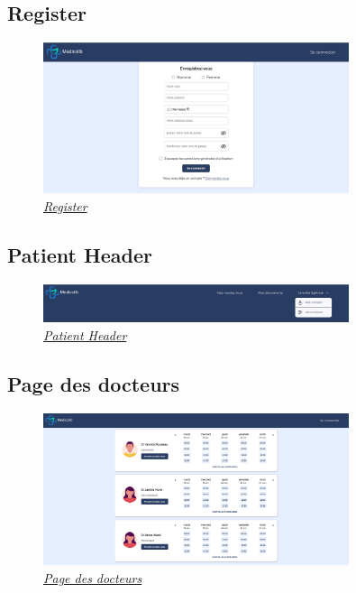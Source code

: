 \documentclass[a4paper]{report}
\begin{document}
\subsection{Register}
\begin{figure}[H]
    \vspace{-10pt}
    \centering
    \includegraphics[width=0.8\textwidth]{captures/register.png}
    \caption{\textit{\hyperref[register]{Register}}}
    \label{fig:DCU12}
\end{figure}

\subsection{Patient Header}
\begin{figure}[H]
    \vspace{-10pt}
    \centering
    \includegraphics[width=0.8\textwidth]{captures/patient-header.png}
    \caption{\textit{\hyperref[header]{Patient Header}}}
    \label{fig:DCU13}
\end{figure}

\subsection{Page des docteurs}
\begin{figure}[H]
    \vspace{-10pt}
    \centering
    \includegraphics[width=0.8\textwidth]{captures/docteurs.png}
    \caption{\textit{\hyperref[docteurs]{Page des docteurs}}}
    \label{fig:DCU14}
\end{figure}
\end{document}
